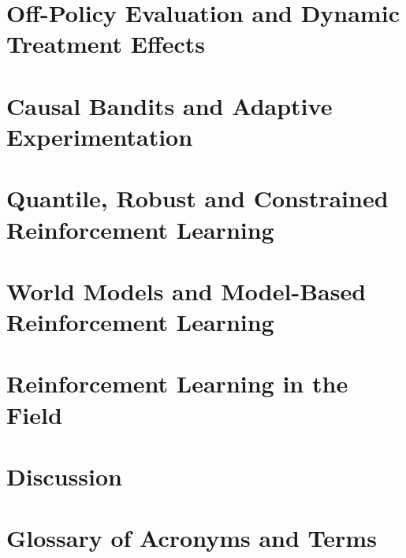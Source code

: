 \documentclass[11pt,notitlepage,a4paper]{article}
\begin{document}
\section{Off-Policy Evaluation and Dynamic Treatment Effects}
\label{section:rl_for_ci}


\section{Causal Bandits and Adaptive Experimentation}
\label{section:adaptive_experiments}


\section{Quantile, Robust and Constrained Reinforcement Learning}
\label{section:dist_robust_constrained}


\section{World Models and Model-Based Reinforcement Learning}
\label{section:world_models}


\section{Reinforcement Learning in the Field}
\label{section:field_deployments}


\section{Discussion}
\label{section:conclusion}






\appendix


\section{Glossary of Acronyms and Terms}
\label{appendix:glossary}

\end{document}
